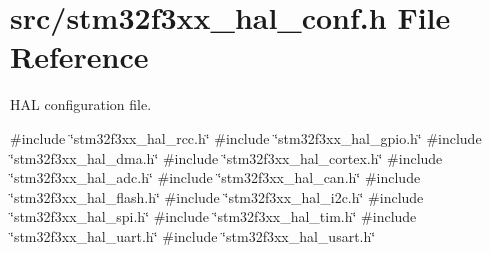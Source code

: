 \section{src/stm32f3xx\+\_\+hal\+\_\+conf.h File Reference}
\label{stm32f3xx__hal__conf_8h}


H\+AL configuration file.  


{\ttfamily \#include \char`\"{}stm32f3xx\+\_\+hal\+\_\+rcc.\+h\char`\"{}}\newline
{\ttfamily \#include \char`\"{}stm32f3xx\+\_\+hal\+\_\+gpio.\+h\char`\"{}}\newline
{\ttfamily \#include \char`\"{}stm32f3xx\+\_\+hal\+\_\+dma.\+h\char`\"{}}\newline
{\ttfamily \#include \char`\"{}stm32f3xx\+\_\+hal\+\_\+cortex.\+h\char`\"{}}\newline
{\ttfamily \#include \char`\"{}stm32f3xx\+\_\+hal\+\_\+adc.\+h\char`\"{}}\newline
{\ttfamily \#include \char`\"{}stm32f3xx\+\_\+hal\+\_\+can.\+h\char`\"{}}\newline
{\ttfamily \#include \char`\"{}stm32f3xx\+\_\+hal\+\_\+flash.\+h\char`\"{}}\newline
{\ttfamily \#include \char`\"{}stm32f3xx\+\_\+hal\+\_\+i2c.\+h\char`\"{}}\newline
{\ttfamily \#include \char`\"{}stm32f3xx\+\_\+hal\+\_\+spi.\+h\char`\"{}}\newline
{\ttfamily \#include \char`\"{}stm32f3xx\+\_\+hal\+\_\+tim.\+h\char`\"{}}\newline
{\ttfamily \#include \char`\"{}stm32f3xx\+\_\+hal\+\_\+uart.\+h\char`\"{}}\newline
{\ttfamily \#include \char`\"{}stm32f3xx\+\_\+hal\+\_\+usart.\+h\char`\"{}}\newline
